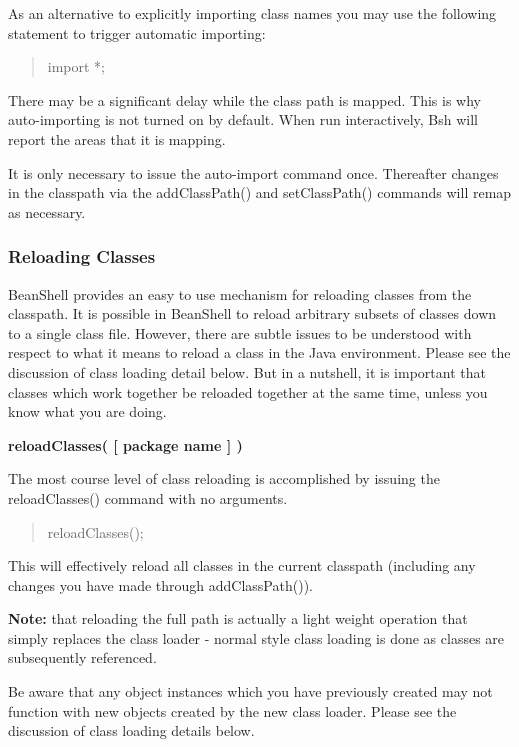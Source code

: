 \documentclass[twoside,11pt,nolof]{starlink}
\begin{document}
As an alternative to explicitly importing class names you may use the
following statement to trigger automatic importing:
\begin{quote}
\begin{terminalv}
    import *;
\end{terminalv}
\end{quote}

There may be a significant delay while the class path is mapped.  This
is why auto-importing is not turned on by default.  When run
interactively, Bsh will report the areas that it is mapping.

It is only necessary to issue the auto-import command once.
Thereafter changes in the classpath via the addClassPath() and
setClassPath() commands will remap as necessary.

\subsubsection{Reloading Classes}

BeanShell provides an easy to use mechanism for reloading classes from
the classpath.  It is possible in BeanShell to reload arbitrary
subsets of classes down to a single class file.  However, there are
subtle issues to be understood with respect to what it means to reload
a class in the Java environment.  Please see the discussion of class
loading detail below.  But in a nutshell, it is important that classes
which work together be reloaded together at the same time, unless you
know what you are doing.

\textbf{reloadClasses( [ package name ] )}

The most course level of class reloading is accomplished by issuing
the reloadClasses() command with no arguments.
\begin{quote}
\begin{terminalv}
    reloadClasses();
\end{terminalv}
\end{quote}

This will effectively reload all classes in the current classpath
(including any changes you have made through addClassPath()).

\textbf{Note:} that reloading the full path is actually a light weight operation that
simply replaces the class loader - normal style class loading is done
as classes are subsequently referenced.

Be aware that any object instances which you have previously created
may not function with new objects created by the new class loader.
Please see the discussion of class loading details below.
\end{document}
